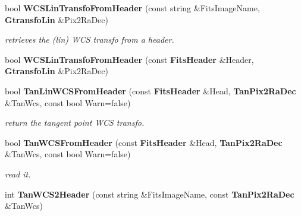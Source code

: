 \begin{CompactItemize}
\item 
{}
bool {\bf WCSLin\-Transfo\-From\-Header} (const string \&Fits\-Image\-Name, {\bf Gtransfo\-Lin} \&Pix2Ra\-Dec)\label{wcsutils_h_a4}

\begin{CompactList}\small\item\em retrieves the (lin) WCS transfo from a header.\item\end{CompactList}\item 
{}
bool {\bf WCSLin\-Transfo\-From\-Header} (const {\bf Fits\-Header} \&Header, {\bf Gtransfo\-Lin} \&Pix2Ra\-Dec)\label{wcsutils_h_a5}

\item 
{}
bool {\bf Tan\-Lin\-WCSFrom\-Header} (const {\bf Fits\-Header} \&Head, {\bf Tan\-Pix2Ra\-Dec} \&Tan\-Wcs, const bool Warn=false)\label{wcsutils_h_a6}

\begin{CompactList}\small\item\em return the tangent point WCS transfo.\item\end{CompactList}\item 
{}
bool {\bf Tan\-WCSFrom\-Header} (const {\bf Fits\-Header} \&Head, {\bf Tan\-Pix2Ra\-Dec} \&Tan\-Wcs, const bool Warn=false)\label{wcsutils_h_a7}

\begin{CompactList}\small\item\em read it.\item\end{CompactList}\item 
{}
int {\bf Tan\-WCS2Header} (const string \&Fits\-Image\-Name, const {\bf Tan\-Pix2Ra\-Dec} \&Tan\-Wcs)\label{wcsutils_h_a8}


\end{CompactItemize}

